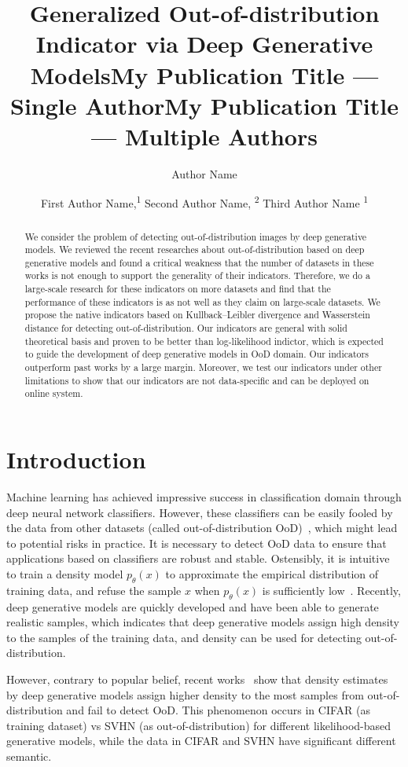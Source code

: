\documentclass[letterpaper]{article} %
\title{Generalized Out-of-distribution Indicator via Deep Generative Models}
\author{
}
\title{My Publication Title --- Single Author}
\author {
    Author Name \\
}
\title{My Publication Title --- Multiple Authors}
\author {

        First Author Name,\textsuperscript{\rm 1}
        Second Author Name, \textsuperscript{\rm 2}
        Third Author Name \textsuperscript{\rm 1} \\
}
\begin{document}
\maketitle

\begin{abstract}

We consider the problem of detecting out-of-distribution images by deep generative models. We reviewed the recent researches about out-of-distribution based on deep generative models and found a critical weakness that the number of datasets in these works is not enough to support the generality of their indicators. 
Therefore, we do a large-scale research for these indicators on more datasets and find that the performance of these indicators is as not well as they claim on large-scale datasets. 
We propose the native indicators based on Kullback–Leibler divergence and Wasserstein distance for detecting out-of-distribution. 
Our indicators are general with solid theoretical basis and proven to be better than log-likelihood indictor, which is expected to guide the development of deep generative models in OoD domain. 
Our indicators outperform past works by a large margin. Moreover, we test our indicators under other limitations to show that our indicators are not data-specific and can be deployed on online system. 
 
\end{abstract}

\section{Introduction}
Machine learning has achieved impressive success in classification domain through deep neural network classifiers. However, these classifiers can be easily fooled by the data from other datasets (called out-of-distribution OoD)~\cite{nguyen2015deep}, which might lead to potential risks in practice. It is necessary to detect OoD data to ensure that applications based on classifiers are robust and stable. Ostensibly, it is intuitive to train a density model $p_\theta(x)$ to approximate the empirical distribution of training data, and refuse the sample $x$ when $p_\theta(x)$ is sufficiently low~\cite{bishop1994novelty}. 
Recently, deep generative models are quickly developed and have been able to generate realistic samples, which indicates that deep generative models assign high density to the samples of the training data, and density can be used for detecting out-of-distribution. 

However, contrary to popular belief, recent works~\cite{nalisnick2018deep,choi2018waic,hendrycks2018deep} show that density estimates by deep generative models assign higher density to the most samples from out-of-distribution and fail to detect OoD. This phenomenon occurs in CIFAR (as training dataset) vs SVHN (as out-of-distribution) for different likelihood-based generative models, while the data in CIFAR and SVHN have significant different semantic. 
\end{document}
